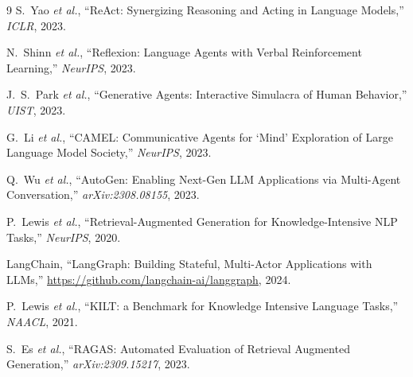 \documentclass[10pt,twocolumn]{article}
\begin{document}
\begin{thebibliography}{9}
\small
{}
S.~Yao \emph{et al.},
``ReAct: Synergizing Reasoning and Acting in Language Models,''
\emph{ICLR}, 2023.

N.~Shinn \emph{et al.},
``Reflexion: Language Agents with Verbal Reinforcement Learning,''
\emph{NeurIPS}, 2023.

J.~S.~Park \emph{et al.},
``Generative Agents: Interactive Simulacra of Human Behavior,''
\emph{UIST}, 2023.

G.~Li \emph{et al.},
``CAMEL: Communicative Agents for `Mind' Exploration of Large Language Model
Society,'' \emph{NeurIPS}, 2023.

Q.~Wu \emph{et al.},
``AutoGen: Enabling Next-Gen LLM Applications via Multi-Agent Conversation,''
\emph{arXiv:2308.08155}, 2023.

P.~Lewis \emph{et al.},
``Retrieval-Augmented Generation for Knowledge-Intensive NLP Tasks,''
\emph{NeurIPS}, 2020.

LangChain, ``LangGraph: Building Stateful, Multi-Actor Applications with LLMs,''
\url{https://github.com/langchain-ai/langgraph}, 2024.

P.~Lewis \emph{et al.},
``KILT: a Benchmark for Knowledge Intensive Language Tasks,''
\emph{NAACL}, 2021.

S.~Es \emph{et al.},
``RAGAS: Automated Evaluation of Retrieval Augmented Generation,''
\emph{arXiv:2309.15217}, 2023.
\end{thebibliography}
\end{document}
